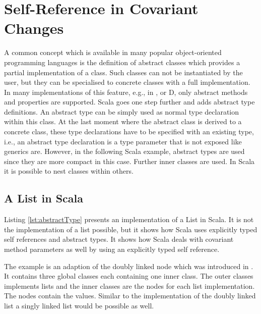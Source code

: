 \section{Self-Reference in Covariant Changes}
A common concept which is available in many popular object-oriented
programming languages is the definition of abstract classes which provides
a partial implementation of a class. Such classes can not be instantiated
by the user, but they can be specialised to concrete classes with a full
implementation. In many implementations of this feature, e.g., in \cpp,
\cs or D, only abstract methods and properties are supported. Scala
goes one step further and adds abstract type definitions. An abstract
type can be simply used as normal type declaration within this class. At
the last moment where the abstract class is derived to a concrete class,
these type declarations have to be specified with an existing type, i.e.,
an abstract type declaration is a type parameter that is not exposed
like generics are. However, in the following Scala example, abstract
types are used since they are more compact in this case. Further inner
classes are used. In Scala it is possible to nest classes within others.

\subsection{A List in Scala}
Listing \ref{lst:abstractType} presents an implementation of a List
in Scala. It is not the implementation of a list possible, but it shows
how Scala uses explicitly typed self references and abstract types. It
shows how Scala deals with covariant method parameters as well by using
an explicitly typed self reference.

The example is an adaption of the doubly linked node which was
introduced in . It contains three global classes
each containing one inner class. The outer classes implements lists and
the inner classes are the nodes for each list implementation. The nodes
contain the values.  Similar to the implementation of the doubly linked
list a singly linked list would be possible as well.

